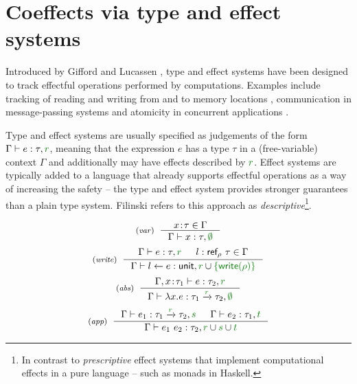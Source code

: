 \section{Coeffects via type and effect systems}
\label{sec:path-eff}

Introduced by Gifford and Lucassen \cite{effects-gifford,effects-polymorphic}, type and effect
systems have been designed to track effectful operations performed by computations. Examples
include tracking of reading and writing from and to memory locations \cite{effects-talpin-et-al},
communication in message-passing systems \cite{effects-messagepassing} and atomicity in concurrent
applications \cite{effects-atomicity}.

Type and effect systems are usually specified as judgements of the form $\Gamma \vdash e : \tau, \cclrd{r}$,
meaning that the expression $e$ has a type $\tau$ in a (free-variable) context $\Gamma$ and
additionally may have effects described by $\cclrd{r}$. Effect systems are typically added to a
language that already supports effectful operations as a way of increasing the safety -- the type
and effect system provides stronger guarantees than a plain type system. Filinski
\cite{effects-comprehensive} refers to this approach as \emph{descriptive}\footnote{In contrast
to \emph{prescriptive} effect systems that implement computational effects in a pure language
-- such as monads in Haskell.}.


\begin{figure}[t]
\begin{equation*}
\tyrule{var}
  {x\!:\!\tau \in \Gamma }
  {\Gamma \vdash x : \tau, \cclrd{\emptyset} }
\end{equation*}
\begin{equation*}
\tyrule{write}
  {\Gamma \vdash e : \tau, \cclrd{r} & l:\ident{ref}_\rho~\tau\in \Gamma}
  {\Gamma \vdash l \leftarrow e : \ident{unit}, \cclrd{r} \cup \cclrd{\{\ident{write}(\rho)\}} }
\end{equation*}
\begin{equation*}
\tyrule{abs}
  {\Gamma, x\!:\!\tau_1 \vdash e : \tau_2, \cclrd{r} }
  {\Gamma \vdash \lambda x.e : \tau_1 \xrightarrow{\cclrd{r}} \tau_2, \cclrd{\emptyset} }
\end{equation*}
\begin{equation*}
\tyrule{app}
  {\Gamma \vdash e_1 : \tau_1 \xrightarrow{\cclrd{r}} \tau_2, \cclrd{s} &
   \Gamma \vdash e_2 : \tau_1, \cclrd{t} }
  {\Gamma \vdash e_1~e_2 : \tau_2, \cclrd{r} \cup \cclrd{s} \cup \cclrd{t} }
\end{equation*}

\label{fig:path-eff}
\end{figure}


